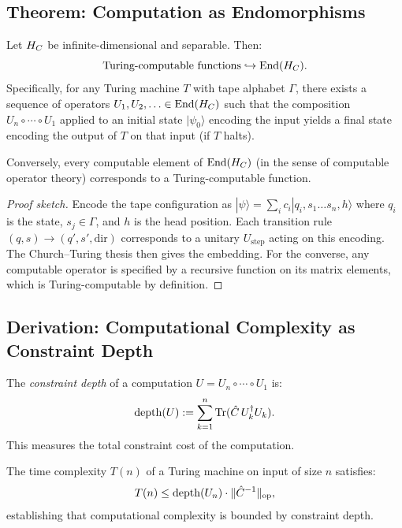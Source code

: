\subsection{Theorem: Computation as Endomorphisms}

\begin{theorem}\label{thm:17.3}
Let $H_C$ be infinite-dimensional and separable.  Then:
\[
  \text{Turing-computable functions} \hookrightarrow \mathrm{End}(H_C).
\]
Specifically, for any Turing machine $T$ with tape alphabet $\Gamma$,
there exists a sequence of operators
$U_1, U_2, \ldots \in \mathrm{End}(H_C)$ such that the composition
$U_n \circ \cdots \circ U_1$ applied to an initial state
$|\psi_0\rangle$ encoding the input yields a final state encoding
the output of $T$ on that input (if $T$ halts).

Conversely, every computable element of $\mathrm{End}(H_C)$ (in the
sense of computable operator theory) corresponds to a Turing-computable
function.
\end{theorem}

\begin{proof}[Proof sketch]
Encode the tape configuration as $|\psi\rangle = \sum_{i} c_i |q_i,
s_1 \ldots s_n, h\rangle$ where $q_i$ is the state, $s_j \in \Gamma$,
and $h$ is the head position.  Each transition rule
$(q, s) \to (q', s', \mathrm{dir})$ corresponds to a unitary
$U_{\mathrm{step}}$ acting on this encoding.  The Church--Turing
thesis then gives the embedding.  For the converse, any computable
operator is specified by a recursive function on its matrix elements,
which is Turing-computable by definition.
\end{proof}

\subsection{Derivation: Computational Complexity as Constraint Depth}

\begin{definition}\label{def:17.7}
The \emph{constraint depth} of a computation $U = U_n \circ \cdots
\circ U_1$ is:
\[
  \mathrm{depth}(U) := \sum_{k=1}^{n} \mathrm{Tr}(\hat{C}\, U_k^\dagger U_k).
\]
This measures the total constraint cost of the computation.
\end{definition}

\begin{proposition}\label{prop:17.2}
The time complexity $T(n)$ of a Turing machine on input of size $n$
satisfies:
\[
  T(n) \leq \mathrm{depth}(U_n) \cdot \|\hat{C}^{-1}\|_{\mathrm{op}},
\]
establishing that computational complexity is bounded by constraint
depth.
\end{proposition}


